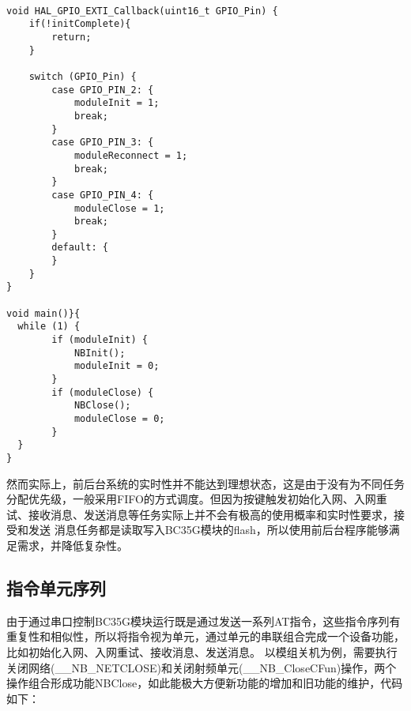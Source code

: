 \begin{lstlisting}

void HAL_GPIO_EXTI_Callback(uint16_t GPIO_Pin) {
    if(!initComplete){
        return;
    }

    switch (GPIO_Pin) {
        case GPIO_PIN_2: {
            moduleInit = 1;
            break;
        }
        case GPIO_PIN_3: {
            moduleReconnect = 1;
            break;
        }
        case GPIO_PIN_4: {
            moduleClose = 1;
            break;
        }
        default: {
        }
    }
}

void main()}{
  while (1) {
        if (moduleInit) {
            NBInit();
            moduleInit = 0;
        }
        if (moduleClose) {
            NBClose();
            moduleClose = 0;
        }
  }
}
\end{lstlisting}

然而实际上，前后台系统的实时性并不能达到理想状态，这是由于没有为不同任务分配优先级，一般采用FIFO的方式调度。但因为按键触发初始化入网、入网重试、接收消息、发送消息等任务实际上并不会有极高的使用概率和实时性要求，接受和发送
消息任务都是读取写入BC35G模块的flash，所以使用前后台程序能够满足需求，并降低复杂性。

\subsection{指令单元序列}
由于通过串口控制BC35G模块运行既是通过发送一系列AT指令，这些指令序列有重复性和相似性，所以将指令视为单元，通过单元的串联组合完成一个设备功能，比如初始化入网、入网重试、接收消息、发送消息。
以模组关机为例，需要执行关闭网络(\_\_NB\_NETCLOSE)和关闭射频单元(\_\_NB\_CloseCFun)操作，两个操作组合形成功能NBClose，如此能极大方便新功能的增加和旧功能的维护，代码如下：

